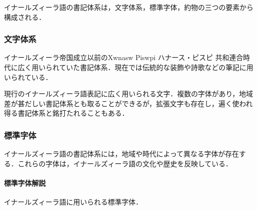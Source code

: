 \documentclass[
  japanese,
]{article}
\providecommand{\tightlist}{%
  \setlength{\itemsep}{0pt}\setlength{\parskip}{0pt}}
\begin{document}
イナールズィーラ語の書記体系は，文字体系，標準字体，約物の三つの要素から構成される．

\subsubsection{文字体系}\label{section3.1}

\begin{description}
\tightlist
\item[ピスピ文字]
イナールズィーラ帝国成立以前の{Xwnasw Piswpi} ハナース・ピスピ
共和連合時代に広く用いられていた書記体系．現在では伝統的な装飾や詩歌などの筆記に用いられている．
\item[イナールズィーラ文字]
現行のイナールズィーラ語表記に広く用いられる文字．複数の字体があり，地域差が甚だしい書記体系とも取ることができるが，拡張文字も存在し，遍く使われ得る書記体系と銘打たれることもある．
\end{description}

\subsubsection{標準字体}\label{section3.2}

イナールズィーラ語の書記体系には，地域や時代によって異なる字体が存在する．これらの字体は，イナールズィーラ語の文化や歴史を反映している．

\paragraph{標準字体解説}\label{subsection3.2.1}

イナールズィーラ語に用いられる標準字体．
\end{document}
